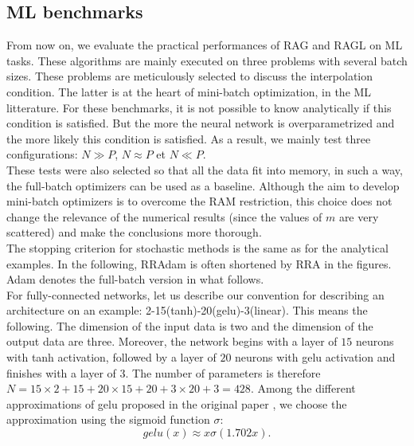 \subsection{ML benchmarks}
\label{ML_benchs}

From now on, we evaluate the practical performances of RAG and RAGL on ML tasks. These algorithms are mainly executed on three problems with several batch sizes. These problems are
meticulously selected to discuss the interpolation condition. The latter is at the heart of mini-batch optimization, in the ML litterature. For these benchmarks, it is not possible
to know analytically if this condition is satisfied. But the more the neural network is overparametrized and the more likely this condition is satisfied. As a result, we mainly test three configurations: $N\gg P$, $N\approx P$ et $N\ll P$. \\
These tests were also selected so that all the data fit into memory, in such a way, the full-batch optimizers can be used as a baseline. Although the aim to develop mini-batch
optimizers is to overcome the RAM restriction, this choice does not change the relevance of the numerical results (since the values of $m$ are very scattered) and make the
conclusions more thorough.\\ 
The stopping criterion for stochastic methods is the same as for the analytical examples. In the following, RRAdam is often shortened by RRA in the figures. Adam denotes the full-batch version in what follows. \\
For fully-connected networks, let us describe our convention for describing an architecture on an example: 2-15(tanh)-20(gelu)-3(linear). This means the following. The dimension of the input data is two and the dimension of the output data are three. Moreover, the network begins with a layer of $15$ neurons with tanh activation, followed by a layer of $20$ neurons with gelu activation \cite{gelu} and finishes with a layer of $3$. The number of parameters is therefore $N=15\times 2 + 15 + 20\times 15 + 20 + 3\times 20 + 3 = 428$.
Among the different approximations of gelu proposed in the original paper \cite{gelu}, we choose the approximation using the sigmoid function $\sigma$:
\begin{equation*}
	gelu(x) \approx x\sigma(1.702x).
\end{equation*}
